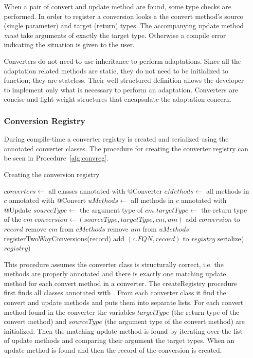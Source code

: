 When a pair of convert and update method are found, some type checks are performed. In order to register a conversion \zamk looks a the convert method's source (single parameter) and target (return) types. The accompanying update method \emph{must} take arguments of exactly the target type. Otherwise a compile error indicating the situation is given to the user. 

Converters do not need to use inheritance to perform adaptations.
Since all the adaptation related methods are static, they do not need to be initialized to function; they are stateless.
Their well-structured definition allows the developer to implement only what is necessary to perform an adaptation. 
Converters are concise and light-weight structures that encapsulate the adaptation concern.

\subsubsection{Conversion Registry}
\label{sec:adapter:convreg}
During compile-time a converter registry is created and serialized using the annotated converter classes. 
The procedure for creating the converter registry can be seen in Procedure~\ref{alg:convreg}. 

\begin{algorithm}
\caption{Creating the conversion registry}\label{alg:convreg}
	\begin{algorithmic}[1]
			\State $converters \gets $ all classes annotated with @Converter
			\State $cMethods \gets $ all methods in $c$ annotated with @Convert
			\State $uMethods \gets$ all methods in $c$ annotated with @Update
			\State $sourceType \gets $ the argument type of $cm$
			\State $targetType \gets $ the return type of the $cm$
					\State $conversion \gets (sourceType, targetType, cm, um)$
					\State add $conversion$ to $record$
					\State remove $cm$ from $cMethods$
					\State remove $um$ from $uMethods$
				\EndIf
			\EndFor
			\EndFor
			\State registerTwoWayConversions(record)
			\State add $(c.FQN, record)$ to $registry$
			\EndFor
			\State serialize($registry$)
		\EndProcedure
	\end{algorithmic}
\end{algorithm}


This procedure assumes the converter class is structurally correct, i.e. the methods are properly annotated and there is exactly one matching update method for each convert method in a converter. 
The createRegistry procedure first finds all classes annotated with . 
From each converter class it find the convert and update methods and puts them into separate lists. 
For each convert method found in the converter the variables $targetType$ (the return type of the convert method) and $sourceType$ (the argument type of the convert method) are initialized. 
Then the matching update method is found by iterating over the list of update methods and comparing their argument the target types. 
When an update method is found and then the record of the conversion is created. 

